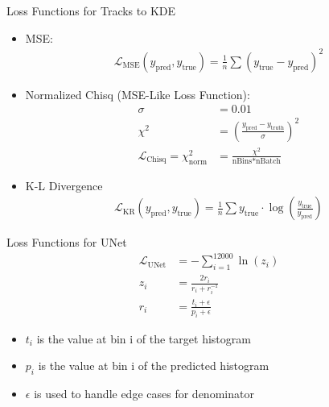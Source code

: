 \documentclass[xcolor=table,aspectratio=169]{beamer}
\newcommand{\Lagr}{\mathcal{L}}
\begin{document}
\begin{frame}{Loss Functions for Tracks to KDE}
    \begin{itemize}
        \item MSE:
        \begin{align*}
            \Lagr_{\text{MSE}} \left( y_{\text{pred}}, y_{\text{true}} \right) = \frac{1}{n}\sum \left(y_{\text{true}} - y_{\text{pred}} \right)^2
        \end{align*}
        \item Normalized Chisq (MSE-Like Loss Function):
        \begin{align*}
            \sigma &= 0.01 \\
            \chi^2 &= \left( \frac{y_{\text{pred}} - y_{\text{truth}}}{\sigma} \right)^2 \\
            \Lagr_{\text{Chisq}} = \chi^2_{\text{norm}} &= \frac{\chi^2}{\text{nBins} * \text{nBatch}}
        \end{align*}
        \item K-L Divergence
        \begin{align*}
            \Lagr_{\text{KR}} \left( y_{\text{pred}}, y_{\text{true}} \right) = \frac{1}{n}\sum y_{\text{true}} \cdot \log(\frac{y_{\text{true}}}{y_{\text{pred}}})
        \end{align*}
    \end{itemize}
\end{frame}

\begin{frame}{Loss Functions for UNet}
    \begin{align*}
        \Lagr_{\text{UNet}} &= - \sum_{i=1}^{12000} \ln(z_i) \\
        z_i &= \frac{2r_i}{r_i + r_i^{-1}} \\
        r_i &= \frac{t_i + \epsilon}{p_i + \epsilon}
    \end{align*}

    \begin{itemize}
        \item \(t_i\) is the value at bin i of the target histogram
        \item \(p_i\) is the value at bin i of the predicted histogram
        \item \(\epsilon\) is used to handle edge cases for denominator
    \end{itemize}
\end{frame}

\end{document}

